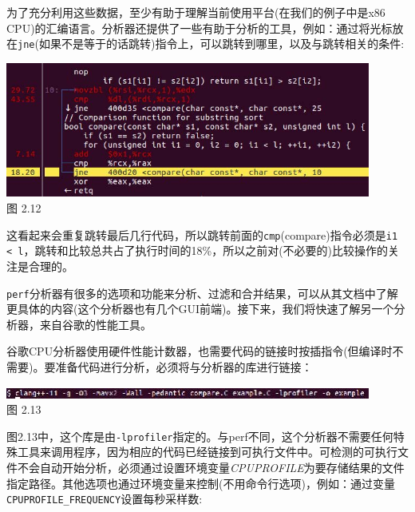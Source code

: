 为了充分利用这些数据，至少有助于理解当前使用平台(在我们的例子中是x86 CPU)的汇编语言。分析器还提供了一些有助于分析的工具，例如：通过将光标放在\texttt{jne}(如果不是等于的话跳转)指令上，可以跳转到哪里，以及与跳转相关的条件:

\begin{center}
\includegraphics[width=0.9\textwidth]{content/1/chapter2/images/12.jpg}\\
图 2.12
\end{center}

这看起来会重复跳转最后几行代码，所以跳转前面的\texttt{cmp}(compare)指令必须是\texttt{i1 < l}，跳转和比较总共占了执行时间的18\%，所以之前对(不必要的)比较操作的关注是合理的。

\texttt{perf}分析器有很多的选项和功能来分析、过滤和合并结果，可以从其文档中了解更具体的内容(这个分析器也有几个GUI前端)。接下来，我们将快速了解另一个分析器，来自谷歌的性能工具。


谷歌CPU分析器使用硬件性能计数器，也需要代码的链接时按插指令(但编译时不需要)。要准备代码进行分析，必须将与分析器的库进行链接：

\begin{center}
\includegraphics[width=0.9\textwidth]{content/1/chapter2/images/13.jpg}\\
图 2.13
\end{center}

图2.13中，这个库是由\texttt{-lprofiler}指定的。与perf不同，这个分析器不需要任何特殊工具来调用程序，因为相应的代码已经链接到可执行文件中。可检测的可执行文件不会自动开始分析，必须通过设置环境变量\textit{CPUPROFILE}为要存储结果的文件指定路径。其他选项也通过环境变量来控制(不用命令行选项)，例如：通过变量\texttt{CPUPROFILE\_FREQUENCY}设置每秒采样数:

